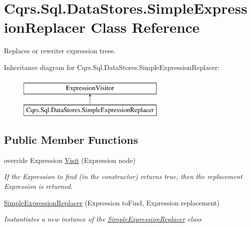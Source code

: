 \hypertarget{classCqrs_1_1Sql_1_1DataStores_1_1SimpleExpressionReplacer}{}\section{Cqrs.\+Sql.\+Data\+Stores.\+Simple\+Expression\+Replacer Class Reference}
\label{classCqrs_1_1Sql_1_1DataStores_1_1SimpleExpressionReplacer}


Replaces or rewriter expression trees.  


Inheritance diagram for Cqrs.\+Sql.\+Data\+Stores.\+Simple\+Expression\+Replacer\+:\begin{figure}[H]
\begin{center}
\leavevmode
\includegraphics[height=2.000000cm]{classCqrs_1_1Sql_1_1DataStores_1_1SimpleExpressionReplacer}
\end{center}
\end{figure}
\subsection*{Public Member Functions}
\begin{DoxyCompactItemize}
\item 
override Expression \hyperlink{classCqrs_1_1Sql_1_1DataStores_1_1SimpleExpressionReplacer_a362c833782ea518d3b10f74898136241_a362c833782ea518d3b10f74898136241}{Visit} (Expression node)
\begin{DoxyCompactList}\small\item\em If the Expression to find (in the constructor) returns true, then the replacement Expression is returned. \end{DoxyCompactList}\item 
\hyperlink{classCqrs_1_1Sql_1_1DataStores_1_1SimpleExpressionReplacer_a71555cd5aeb393426bedce91d3325cd0_a71555cd5aeb393426bedce91d3325cd0}{Simple\+Expression\+Replacer} (Expression to\+Find, Expression replacement)
\begin{DoxyCompactList}\small\item\em Instantiates a new instance of the \hyperlink{classCqrs_1_1Sql_1_1DataStores_1_1SimpleExpressionReplacer}{Simple\+Expression\+Replacer} class \end{DoxyCompactList}\end{DoxyCompactItemize}



